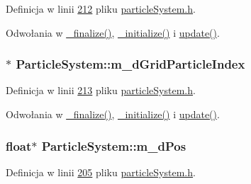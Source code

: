 Definicja w linii \hyperlink{particle_system_8h_source_l00212}{212} pliku \hyperlink{particle_system_8h_source}{particle\-System.\-h}.



Odwołania w \hyperlink{particle_system_8cpp_source_l00233}{\-\_\-finalize()}, \hyperlink{particle_system_8cpp_source_l00142}{\-\_\-initialize()} i \hyperlink{particle_system_8cpp_source_l00266}{update()}.

\hypertarget{class_particle_system_a1a67fc1e3ffd4e64f55a2a315c49c74c}{
\subsubsection[{m\-\_\-d\-Grid\-Particle\-Index}]{$\ast$ Particle\-System\-::m\-\_\-d\-Grid\-Particle\-Index\hspace{0.3cm}{\ttfamily [protected]}}}\label{class_particle_system_a1a67fc1e3ffd4e64f55a2a315c49c74c}


Definicja w linii \hyperlink{particle_system_8h_source_l00213}{213} pliku \hyperlink{particle_system_8h_source}{particle\-System.\-h}.



Odwołania w \hyperlink{particle_system_8cpp_source_l00233}{\-\_\-finalize()}, \hyperlink{particle_system_8cpp_source_l00142}{\-\_\-initialize()} i \hyperlink{particle_system_8cpp_source_l00266}{update()}.

\hypertarget{class_particle_system_afff6217d2726217dff77c81ef3c23bfa}{
\subsubsection[{m\-\_\-d\-Pos}]{\setlength{\rightskip}{0pt plus 5cm}float$\ast$ Particle\-System\-::m\-\_\-d\-Pos\hspace{0.3cm}{\ttfamily [protected]}}}\label{class_particle_system_afff6217d2726217dff77c81ef3c23bfa}


Definicja w linii \hyperlink{particle_system_8h_source_l00205}{205} pliku \hyperlink{particle_system_8h_source}{particle\-System.\-h}.




